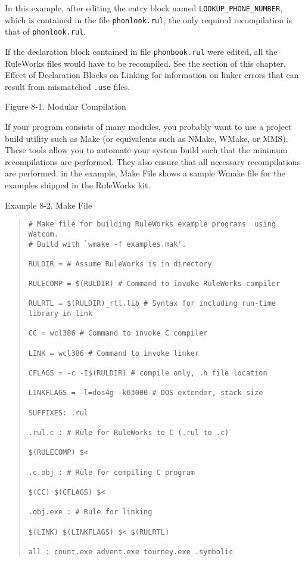 In this example, after editing the entry block named
\verb|LOOKUP_PHONE_NUMBER|, which is contained in the file
\verb|phonlook.rul|, the only required recompilation is that of
\verb|phonlook.rul|.

If the declaration block contained in file \verb|phonbook.rul| were
edited, all the RuleWorks files would have to be recompiled. See the
section of this chapter, Effect of Declaration Blocks on Linking for
information on linker errors that can result from mismatched
\verb|.use| files.

Figure 8-1. Modular Compilation

If your program consists of many modules, you probably want to use a
project build utility such as Make (or equivalents such as NMake,
WMake, or MMS). These tools allow you to automate your system build
such that the minimum recompilations are performed. They also ensure
that all necessary recompilations are performed. in the example, Make
File shows a sample Wmake file for the examples shipped in the
RuleWorks kit.

Example 8-2. Make File
\begin{example}[h]
\begin{quote}
\begin{verbatim}
# Make file for building RuleWorks example programs  using Watcom.
# Build with `wmake -f examples.mak'.

RULDIR = # Assume RuleWorks is in directory

RULECOMP = $(RULDIR) # Command to invoke RuleWorks compiler

RULRTL = $(RULDIR)_rtl.lib # Syntax for including run-time library in link

CC = wcl386 # Command to invoke C compiler

LINK = wcl386 # Command to invoke linker

CFLAGS = -c -I$(RULDIR) # compile only, .h file location

LINKFLAGS = -l=dos4g -k63000 # DOS extender, stack size

SUFFIXES: .rul

.rul.c : # Rule for RuleWorks to C (.rul to .c)

$(RULECOMP) $<

.c.obj : # Rule for compiling C program

$(CC) $(CFLAGS) $<

.obj.exe : # Rule for linking

$(LINK) $(LINKFLAGS) $< $(RULRTL)

all : count.exe advent.exe tourney.exe .symbolic
\end{verbatim}
\end{quote}
\end{example}

